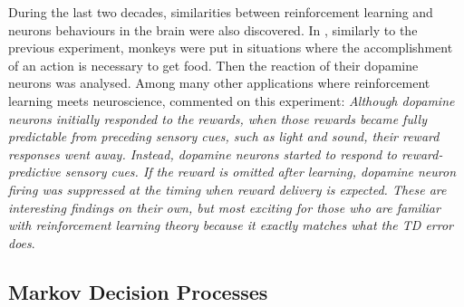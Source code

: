 			During the last two decades, similarities between reinforcement learning and neurons behaviours in the brain were also discovered. In \cite{Schultz1995,Schultz1998}, similarly to the previous experiment, monkeys were put in situations where the accomplishment of an action is necessary to get food. Then the reaction of their dopamine neurons was analysed. Among many other applications where reinforcement learning meets neuroscience, \cite{Doya2007} commented on this experiment: \textit{Although dopamine neurons initially responded to the rewards, when those rewards became fully predictable from preceding sensory cues, such as light and sound, their reward responses went away. Instead, dopamine neurons started to respond to reward-predictive sensory cues. If the reward is omitted after learning, dopamine neuron firing was suppressed at the timing when reward delivery is expected. These are interesting findings on their own, but most exciting for those who are familiar with reinforcement learning theory because it exactly matches what the TD error does}.
			
		\subsection{Markov Decision Processes}
        
